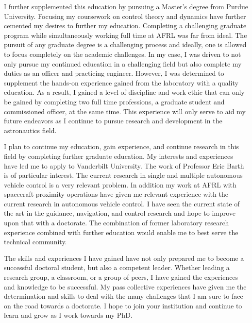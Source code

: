 \documentclass[12pt, oneside]{article}   	%
\begin{document}
I further supplemented this education by pursuing a Master's degree from Purdue University.
Focusing my coursework on control theory and dynamics have further cemented my desires to further my education.
Completing a challenging graduate program while simultaneously working full time at AFRL was far from ideal.
The pursuit of any graduate degree is a challenging process and ideally, one is allowed to focus completely on the academic challenges.
In my case, I was driven to not only pursue my continued education in a challenging field but also complete my duties as an officer and practicing engineer. 
However, I was determined to supplement the hands-on experience gained from the laboratory with a quality education.
As a result, I gained a level of discipline and work ethic that can only be gained by completing two full time professions, a graduate student and commissioned officer, at the same time.
This experience will only serve to aid my future endeavors as I continue to pursue research and development in the astronautics field.



I plan to continue my education, gain experience, and continue research in this field by completing further graduate education.   
My interests and experiences have led me to apply to Vanderbilt University. 
The work of Professor Eric Barth is of particular interest. 
The current research in single and multiple autonomous vehicle control is a very relevant problem.
In addition my work at AFRL with spacecraft proximity operations have given me relevant experience with the current research in autonomous vehicle control.
I have seen the current state of the art in the guidance, navigation, and control research and hope to improve upon that with a doctorate. 
The combination of former laboratory research experience combined with further education would enable me to best serve the technical community.


The skills and experiences I have gained have not only prepared me to become a successful doctoral student, but also a competent leader.
Whether leading a research group, a classroom, or a group of peers, I have gained the experiences and knowledge to be successful. 
My pass collective experiences have given me the determination and skills to deal with the many challenges that I am sure to face on the road towards a doctorate. 
I hope to join your institution and continue to learn and grow as I work towards my PhD.


\end{document}

